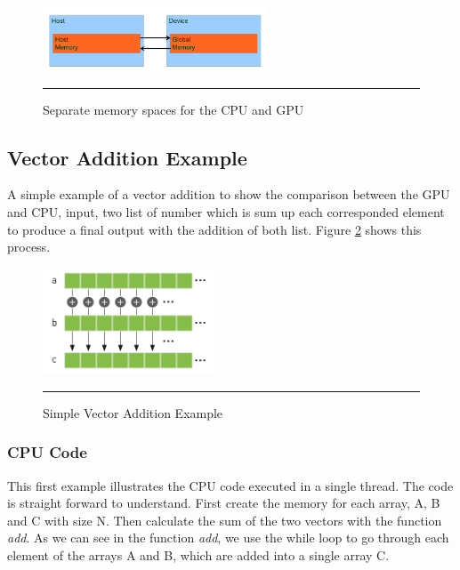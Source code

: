 \begin{figure}[htbp]
	\centering
		\includegraphics[width=0.6\textwidth]{Figures/memorySpace.png}
		\rule{35em}{0.5pt}
	\caption[Memory Space GPU and CPU]{Separate memory spaces for the CPU and GPU}
	\label{fig:memorySpace}
\end{figure}

\subsection{Vector Addition Example}

A simple example of a vector addition to show the comparison between the GPU and CPU, input, two list of number which is sum up each corresponded element to produce a final output with the addition of both list. Figure \ref{fig:sum} shows this process. \cite{example}

\begin{figure}[htbp]
	\centering
		\includegraphics[width=0.45\textwidth]{Figures/sum.png}
		\rule{35em}{0.3pt}
	\caption[Vector Addition Example]{Simple Vector Addition Example}
	\label{fig:sum}
\end{figure}

\subsubsection{CPU Code}

This first example illustrates the CPU code executed in a single thread. The code is straight forward to understand. First create the memory for each array, A, B and C with size N. Then calculate the sum of the two vectors with the function \textit{add}. As we can see in the function \textit{add}, we use the while loop to go through each element of the arrays A and B, which are added into a single array C.

